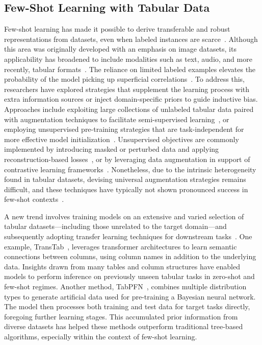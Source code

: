 \subsection{Few-Shot Learning with Tabular Data} Few-shot learning has made it possible to derive transferable and robust representations from datasets, even when labeled instances are scarce~\cite{chen2018closer}. Although this area was originally developed with an emphasis on image datasets, its applicability has broadened to include modalities such as text, audio, and more recently, tabular formats~\cite{majumder2022few,nam2023stunt,schick2021exploiting}. The reliance on limited labeled examples elevates the probability of the model picking up superficial correlations~\cite{bartlett2021deep}. To address this, researchers have explored strategies that supplement the learning process with extra information sources or inject domain-specific priors to guide inductive bias. Approaches include exploiting large collections of unlabeled tabular data paired with augmentation techniques to facilitate semi-supervised learning~\cite{ucar2021subtab,yoon2020vime}, or employing unsupervised pre-training strategies that are task-independent for more effective model initialization~\cite{somepalli2021saint}. Unsupervised objectives are commonly implemented by introducing masked or perturbed data and applying reconstruction-based losses~\cite{arik2021tabnet,majmundar2022met}, or by leveraging data augmentation in support of contrastive learning frameworks~\cite{bahri2022scarf,chen2020simple}. Nonetheless, due to the intrinsic heterogeneity found in tabular datasets, devising universal augmentation strategies remains difficult, and these techniques have typically not shown pronounced success in few-shot contexts~\cite{nam2023stunt}.

A new trend involves training models on an extensive and varied selection of tabular datasets—including those unrelated to the target domain—and subsequently adopting transfer learning techniques for downstream tasks~\cite{zhang2023generative,levin2022transfer,zhu2023xtab}. One example, TransTab~\cite{wang2022transtab}, leverages transformer architectures to learn semantic connections between columns, using column names in addition to the underlying data. Insights drawn from many tables and column structures have enabled models to perform inference on previously unseen tabular tasks in zero-shot and few-shot regimes. Another method, TabPFN~\cite{hollmann2022tabpfn}, combines multiple distribution types to generate artificial data used for pre-training a Bayesian neural network. The model then processes both training and test data for target tasks directly, foregoing further learning stages. This accumulated prior information from diverse datasets has helped these methods outperform traditional tree-based algorithms, especially within the context of few-shot learning.

